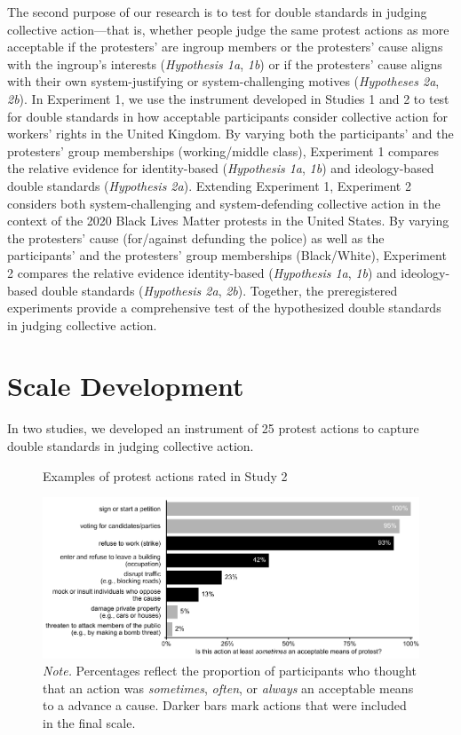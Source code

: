 \documentclass[twocolumn, 11pt, letterpaper]{article}
\begin{document}
The second purpose of our research is to test for double standards in
judging collective action---that is, whether people judge the same
protest actions as more acceptable if the protesters' are ingroup
members or the protesters' cause aligns with the ingroup's interests
(\emph{Hypothesis 1a}, \emph{1b}) or if the protesters' cause aligns
with their own system-justifying or system-challenging motives
(\emph{Hypotheses 2a}, \emph{2b}). In Experiment 1, we use the
instrument developed in Studies 1 and 2 to test for double standards in
how acceptable participants consider collective action for workers'
rights in the United Kingdom. By varying both the participants' and the
protesters' group memberships (working/middle class), Experiment 1
compares the relative evidence for identity-based (\emph{Hypothesis 1a},
\emph{1b}) and ideology-based double standards (\emph{Hypothesis 2a}).
Extending Experiment 1, Experiment 2 considers both system-challenging
and system-defending collective action in the context of the 2020 Black
Lives Matter protests in the United States. By varying the protesters'
cause (for/against defunding the police) as well as the participants'
and the protesters' group memberships (Black/White), Experiment 2
compares the relative evidence identity-based (\emph{Hypothesis 1a},
\emph{1b}) and ideology-based double standards (\emph{Hypothesis 2a},
\emph{2b}). Together, the preregistered experiments provide a
comprehensive test of the hypothesized double standards in judging
collective action.

\hypertarget{scale-development}{%
\section{Scale Development}\label{scale-development}}

In two studies, we developed an instrument of 25 protest actions to
capture double standards in judging collective action.

\begin{figure}[!t]
\centering
\caption{Examples of protest actions rated in Study 2}
\includegraphics[scale=1]{../Scale Development/figures/figure-2}
\caption*{\textit{Note.} Percentages reflect the proportion of participants who thought that an action was \textit{sometimes}, \textit{often}, or \textit{always} an acceptable means to a advance a cause. Darker bars mark actions that were included in the final scale.}
\label{fig:f2}
\end{figure}
\end{document}
